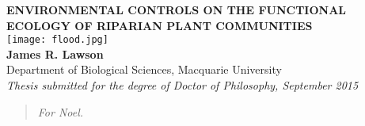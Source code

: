 \documentclass[openright,12pt,a4paper]{memoir}
\begin{document}
\doublespacing
{}

\begin{titlingpage}
\centering
\begin{onehalfspacing}
\vspace{60mm} %
\LARGE{\textbf{ENVIRONMENTAL CONTROLS ON THE FUNCTIONAL ECOLOGY OF RIPARIAN PLANT COMMUNITIES}} \\
\vspace{35mm}
\texttt{[image: flood.jpg]} \\
\vspace{15mm}
\large{\textbf{James R. Lawson}}\\
\small{Department of Biological Sciences, Macquarie University}\\
\vspace{30mm}
\small{\textit{Thesis submitted for the degree of Doctor of Philosophy, September 2015}}\\
\end{onehalfspacing}
\end{titlingpage}

\frontmatter
\clearpage %
\renewcommand{\abstractname}{}
\setlength{\absparindent}{0mm}

\begin{abstract} %
\vspace{50mm}
\begin{center}
\textit{For Noel.}
\end{center}
\end{abstract}
\end{document}
